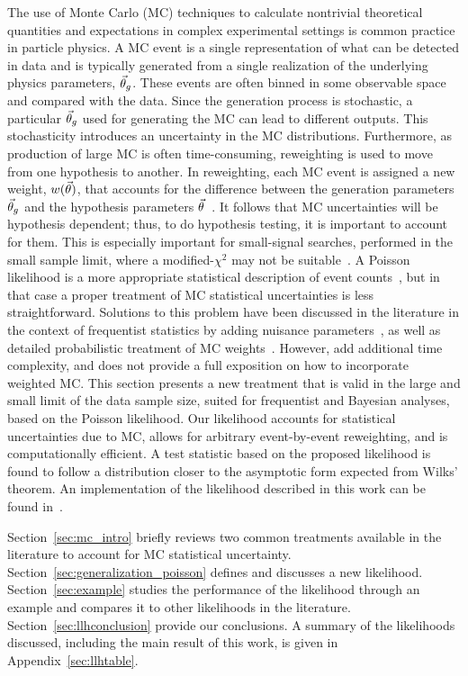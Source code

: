 The use of Monte Carlo (MC) techniques to calculate nontrivial theoretical quantities and expectations in complex experimental settings is common practice in particle physics.
A MC event is a single representation of what can be detected in data and is typically generated from a single realization of the underlying physics parameters, $\vec{\theta}_g$.
These events are often binned in some observable space and compared with the data.
Since the generation process is stochastic, a particular $\vec{\theta}_g$ used for generating the MC can lead to different outputs.
This stochasticity introduces an uncertainty in the MC distributions.
Furthermore, as production of large MC is often time-consuming, reweighting is used to move from one hypothesis to another.
In reweighting, each MC event is assigned a new weight, $w(\vec{\theta})$, that accounts for the difference between the generation parameters $\vec{\theta}_g$ and the hypothesis parameters $\vec{\theta}$~\cite{Gainer:2014bta}.
It follows that MC uncertainties will be hypothesis dependent; thus, to do hypothesis testing, it is important to account for them.
This is especially important for small-signal searches, performed in the small sample limit, where a modified-$\chi^2$ may not be suitable~\cite{Lyons:1986em}.
A Poisson likelihood is a more appropriate statistical description of event counts~\cite{poisson1837recherches}, but in that case a proper treatment of MC statistical uncertainties is less straightforward.
Solutions to this problem have been discussed in the literature in the context of frequentist statistics by adding nuisance parameters~\cite{Barlow:1993dm,Cranmer:2012sba,Chirkin:2013lya}, as well as detailed probabilistic treatment of MC weights~\cite{Glusenkamp:2017rlp}.
However, \cite{Barlow:1993dm, Chirkin:2013lya, Glusenkamp:2017rlp} add additional time complexity, and \cite{Cranmer:2012sba} does not provide a full exposition on how to incorporate weighted MC.
This section presents a new treatment that is valid in the large and small limit of the data sample size, suited for frequentist and Bayesian analyses, based on the Poisson likelihood.
Our likelihood accounts for statistical uncertainties due to MC, allows for arbitrary event-by-event reweighting, and is computationally efficient.
A test statistic based on the proposed likelihood is found to follow a distribution closer to the asymptotic form expected from Wilks' theorem.
An implementation of the likelihood described in this work can be found in~\cite{MCLLH}.

Section~\ref{sec:mc_intro} briefly reviews two common treatments available in the literature to account for MC statistical uncertainty.
Section~\ref{sec:generalization_poisson} defines and discusses a new likelihood.
Section~\ref{sec:example} studies the performance of the likelihood through an example and compares it to other likelihoods in the literature.
Section~\ref{sec:llhconclusion} provide our conclusions.
A summary of the likelihoods discussed, including the main result of this work, is given in Appendix~\ref{sec:llhtable}.

